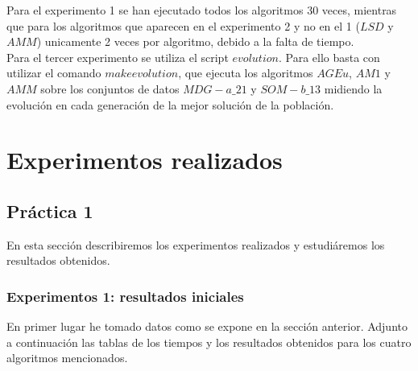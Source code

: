 \documentclass[11pt,a4paper]{article}
\begin{document}
	Para el experimento 1 se han ejecutado todos los algoritmos 30 veces, mientras que para los algoritmos que aparecen en el experimento 2 y no en el 1 ($LSD$ y $AMM$) unicamente 2 veces por algoritmo, debido a la falta de tiempo. \\
	
	Para el tercer experimento se utiliza el script $evolution$. Para ello basta con utilizar el comando $make evolution$, que ejecuta los algoritmos $AGEu$, $AM1$ y $AMM$ sobre los conjuntos de datos $MDG-a\_21$ y $SOM-b\_13$ midiendo la evolución en cada generación de la mejor solución de la población.
	
	\section{Experimentos realizados}
	
	\subsection{Práctica 1}
	
	En esta sección describiremos los experimentos realizados y estudiáremos los resultados obtenidos. 
	
	\subsubsection{Experimentos 1: resultados iniciales}
	
	En primer lugar he tomado datos como se expone en la sección anterior. Adjunto a continuación las tablas de los tiempos y los resultados obtenidos para los cuatro algoritmos mencionados.
	
\end{document}
